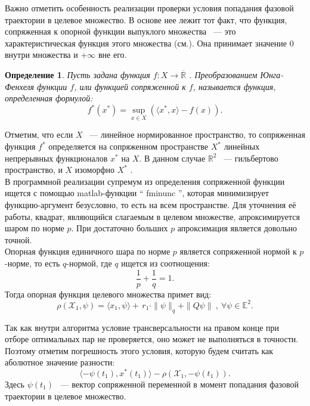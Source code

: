 \documentclass[10pt]{article}
\newtheorem{definition}{Определение}
\begin{document}
Важно отметить особенность реализации проверки условия попадания фазовой траектории в целевое множество. В основе нее лежит тот факт, что функция, сопряженная к опорной функции выпуклого множества ~--- это характеристическая функция этого множества (см.\cite{2}). Она принимает значение 0 внутри множества и \( + \infty \) вне его. 

\begin{definition}
	Пусть задана функция \( f: X \to \overline{\mathbb{R}} \) . Преобразованием Юнга-Фенхеля функции \( f \), или функцией сопряженной к \( f \), называется функция, определенная формулой: 
	\[ f^{*}(x^{*})=\sup _{x\in X} ( \langle x^{*} , x \rangle -f(x) ). \]
\end{definition}

Отметим, что если \( X \) ~--- линейное нормированное пространство, то сопряженная функция \( f^{*} \) определяется на сопряженном пространстве \( X^{*} \) линейных непрерывных функционалов \( x^{*} \) на \( X \). В данном случае \( \mathbb{R}^2 \) ~--- гильбертово пространство, и \( X \) изоморфно \( X^{*} \) .\smallskip\\
В программной реализации супремум из определения сопряженной функции ищется с помощью matlab-функции `` fminunc '', которая минимизирует функцию-аргумент безусловно, то есть на всем пространстве. Для уточнения её работы, квадрат, являющийся слагаемым в целевом множестве, апроксимируется шаром по норме \( p \). При достаточно больших \( p \) апроксимация является довольно точной.\smallskip\\
Опорная функция единичного шара по норме \( p \) является сопряженной нормой к \(p\)-норме, то есть \(q\)-нормой, где \(q \) ищется из соотнощения:
\[ \frac{1}{p} + \frac{1}{q} = 1. \]
Тогда опорная функция целевого множества примет вид:
\[ \rho(\mathcal{X}_1, \psi) =  \langle x_1, \psi \rangle + \, r_1 \cdot \|\psi\|_q + \|Q\psi\| \ , \ \forall \psi \in \mathbb{E}^2.\]

Так как внутри алгоритма условие трансверсальности на правом конце при отборе оптимальных пар не проверяется, оно может не выполняться в точности. Поэтому отметим погрешность этого условия, которую будем считать как аболютное значение разности:
\[ \langle -\psi(t_1), x^*(t_1) \rangle - \rho(\mathcal{X}_1 , -\psi(t_1)). \]
Здесь \( \psi(t_1) \) ~--- вектор сопряженной переменной в момент попадания фазовой траектории в целевое множество.
\end{document}
